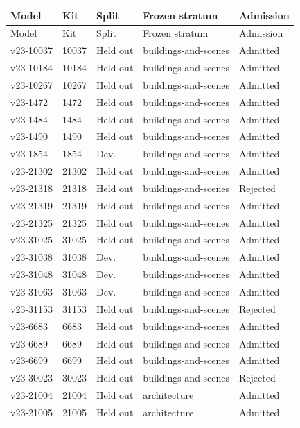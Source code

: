 \begin{longtable}{lllp{}l}\toprule
Model & Kit & Split & Frozen stratum & Admission\\\midrule
\endfirsthead
\toprule
Model & Kit & Split & Frozen stratum & Admission\\\midrule\endhead
\midrule\endfoot
\bottomrule\endlastfoot
v23-10037 & 10037 & Held out & buildings-and-scenes & Admitted\\
v23-10184 & 10184 & Held out & buildings-and-scenes & Admitted\\
v23-10267 & 10267 & Held out & buildings-and-scenes & Admitted\\
v23-1472 & 1472 & Held out & buildings-and-scenes & Admitted\\
v23-1484 & 1484 & Held out & buildings-and-scenes & Admitted\\
v23-1490 & 1490 & Held out & buildings-and-scenes & Admitted\\
v23-1854 & 1854 & Dev. & buildings-and-scenes & Admitted\\
v23-21302 & 21302 & Held out & buildings-and-scenes & Admitted\\
v23-21318 & 21318 & Held out & buildings-and-scenes & Rejected\\
v23-21319 & 21319 & Held out & buildings-and-scenes & Admitted\\
v23-21325 & 21325 & Held out & buildings-and-scenes & Admitted\\
v23-31025 & 31025 & Held out & buildings-and-scenes & Admitted\\
v23-31038 & 31038 & Dev. & buildings-and-scenes & Admitted\\
v23-31048 & 31048 & Dev. & buildings-and-scenes & Admitted\\
v23-31063 & 31063 & Dev. & buildings-and-scenes & Admitted\\
v23-31153 & 31153 & Held out & buildings-and-scenes & Rejected\\
v23-6683 & 6683 & Held out & buildings-and-scenes & Admitted\\
v23-6689 & 6689 & Held out & buildings-and-scenes & Admitted\\
v23-6699 & 6699 & Held out & buildings-and-scenes & Admitted\\
v23-30023 & 30023 & Held out & buildings-and-scenes & Rejected\\
v23-21004 & 21004 & Held out & architecture & Admitted\\
v23-21005 & 21005 & Held out & architecture & Admitted\\

\end{longtable}
